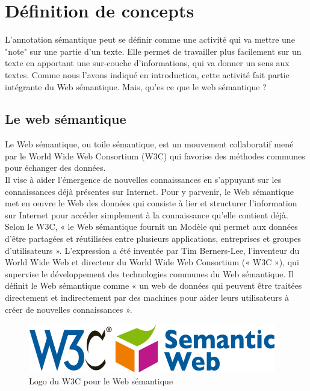 \documentclass[a4paper, 11pt]{report}
\begin{document}
\section{Définition de concepts}
L'annotation sémantique peut se définir comme une activité qui va mettre une "note" sur une partie d'un texte. Elle permet de travailler plus facilement sur un texte en apportant une sur-couche d'informations, qui va donner un sens aux textes. Comme nous l'avons indiqué en introduction, cette activité fait partie intégrante du Web sémantique.
Mais, qu'es ce que le web sémantique ?

\subsection{Le web sémantique}
Le Web sémantique, ou toile sémantique, est un mouvement collaboratif mené par le World Wide Web Consortium (W3C) qui favorise des méthodes communes pour échanger des données.\\
Il vise à aider l'émergence de nouvelles connaissances en s'appuyant sur les connaissances déjà présentes sur Internet. Pour y parvenir, le Web sémantique met en œuvre le Web des données qui consiste à lier et structurer l'information sur Internet pour accéder simplement à la connaissance qu'elle contient déjà.
Selon le W3C, « le Web sémantique fournit un Modèle qui permet aux données d'être partagées et réutilisées entre plusieurs applications, entreprises et groupes d'utilisateurs ».
L'expression a été inventée par Tim Berners-Lee, l'inventeur du World Wide Web et directeur du World Wide Web Consortium (« W3C »), qui supervise le développement des technologies communes du Web sémantique. Il définit le Web sémantique comme « un web de données qui peuvent être traitées directement et indirectement par des machines pour aider leurs utilisateurs à créer de nouvelles connaissances ».
\begin{figure}[h]
\begin{center}
\includegraphics[scale=0.5]{img/Sw-horz-w3c-v.png} 
\end{center}
\caption{Logo du W3C pour le Web sémantique}
\end{figure}
\end{document}

